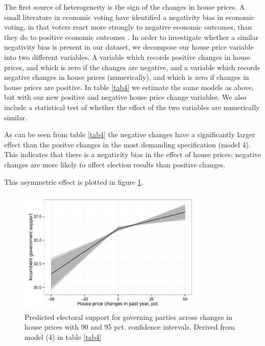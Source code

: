\documentclass[12pt,a4paper]{article}
\begin{document}
The first source of heterogeneity is the sign of the changes in house prices. A small literature in economic voting have identified a negativity bias in economic voting, in that voters react more strongly to negative economic outcomes, than they do to positive economic outcomes \citep[e.g.][]{bloom1975voter}. In order to investigate whether a similar negativity bias is present in our dataset, we decompose our house price variable into two different variables. A variable which records positive changes in house prices, and which is zero if the changes are negative, and a variable which records negative changes in house prices (numerically), and which is zero if changes in house prices are positive. In table \ref{tab4} we estimate the same models as above, but with our new positive and negative house price change variables. We also include a statistical test of whether the effect of the two variables are numerically similar. 

As can be seen from table \ref{tab4} the negative changes have a significantly larger effect than the positve changes in the most demanding specification (model 4). This indicates that there is a negativity bias in the effect of house prices; negative changes are more likely to affect election results than positive changes. 



This asymmetric effect is plotted in figure \ref{posneg}.

\begin{figure}[htbp]
	\includegraphics[page=1,width=0.8\textwidth]{../figures/posnegplot}
	\centering
	\caption{Predicted electoral support for governing parties across changes in house prices with 90 and 95 pct. confidence intervals. Derived from model (4) in table \ref{tab4}}
	\label{posneg}
\end{figure}
\end{document}
